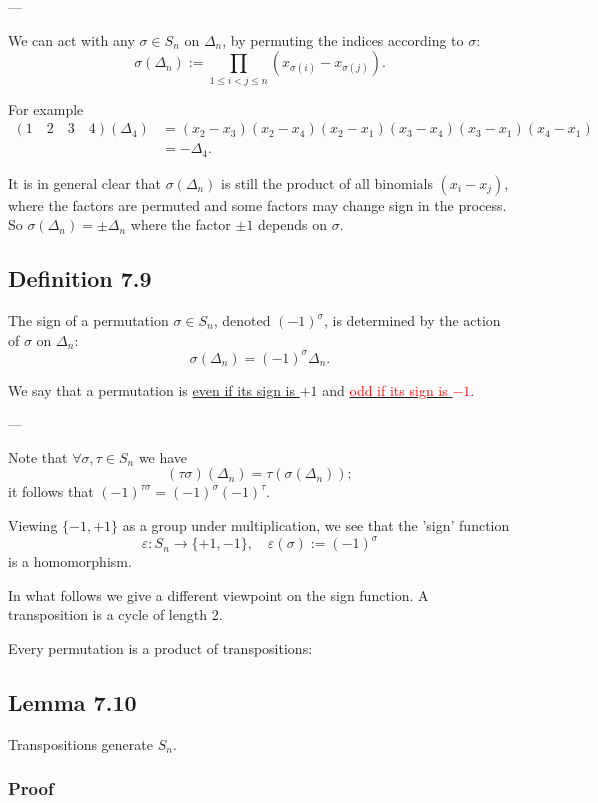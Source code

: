 ---

We can act with any $\sigma \in S_n$ on $\Delta_n$, by permuting the indices according to $\sigma$:
$$ \sigma(\Delta_n) := \prod_{1 \leq i < j \leq n} (x_{\sigma(i)} - x_{\sigma(j)}). $$

For example
\begin{align*}
(1 \quad 2 \quad 3 \quad 4)(\Delta_4) &= (x_2 - x_3)(x_2 - x_4)(x_2 - x_1)(x_3 - x_4)(x_3 - x_1)(x_4 - x_1) \\
&= -\Delta_4.
\end{align*}

It is in general clear that $\sigma(\Delta_n)$ is still the product of all binomials $(x_i - x_j)$, where the factors are permuted and some factors may change sign in the process. So $\sigma(\Delta_n) = \pm \Delta_n$ where the factor $\pm 1$ depends on $\sigma$.
\subsection*{Definition 7.9}

The sign of a permutation $\sigma \in S_n$, denoted $(-1)^\sigma$, is determined by the action of $\sigma$ on $\Delta_n$:
$$ \sigma(\Delta_n) = (-1)^\sigma \Delta_n. $$

We say that a permutation is \underline{even if its sign is $+1$} and \underline{\textcolor{red}{odd if its sign is $-1$}}.

---

Note that $\forall \sigma, \tau \in S_n$ we have
$$ (\tau \sigma)(\Delta_n) = \tau(\sigma(\Delta_n)); $$
it follows that $(-1)^{\tau \sigma} = (-1)^\sigma (-1)^\tau$.

Viewing $\{-1, +1\}$ as a group under multiplication, we see that the 'sign' function
$$ \varepsilon : S_n \longrightarrow \{+1, -1\}, \quad \varepsilon(\sigma) := (-1)^\sigma $$
is a homomorphism.

In what follows we give a different viewpoint on the sign function. A transposition is a cycle of length 2.

\vspace{1em}
Every permutation is a product of transpositions:

\subsection*{Lemma 7.10}

Transpositions generate $S_n$.
\subsubsection*{Proof}


